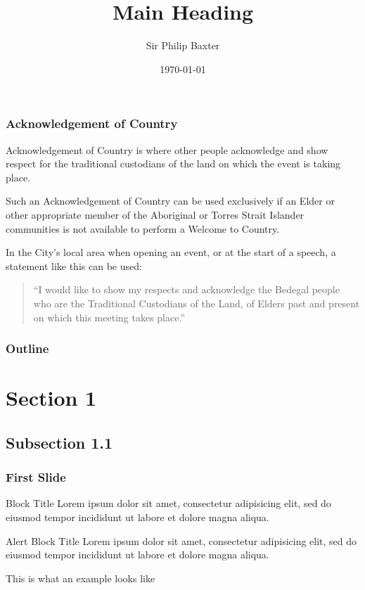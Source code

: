 \documentclass[11 pt, 
			   aspectratio=169
			   ]{beamer}
\title{Main Heading}
\date{\today}
\author[shortname]{Sir Philip Baxter}
\institute[EMU]{Optimal Position for Faculty/School Name}
\begin{document}
\begin{frame}[plain]
	\titlepage
\end{frame}

\begin{frame}
	\frametitle{Acknowledgement of Country}

	Acknowledgement of Country is where other people acknowledge and show respect for the traditional custodians of the land on which the event is taking place.
	
	Such an Acknowledgement of Country can be used exclusively if an Elder or other appropriate member of the Aboriginal or Torres Strait Islander communities is not available to perform a Welcome to Country.
	
	In the City's local area when opening an event, or at the start of a speech, a statement like this can be used:
	\vfill
	\begin{quote}
	``I would like to show my respects and acknowledge the Bedegal people who are the Traditional Custodians of the Land, of Elders past and present on which this meeting takes place.'' 
	\end{quote}
\end{frame}

\begin{frame}
	\frametitle{Outline}
	\tableofcontents
\end{frame}


\section{Section 1}
\subsection{Subsection 1.1}

\sectionframe
\subsectionframe



\begin{frame}
	\frametitle{First Slide}
		\begin{block}{Block Title}
			Lorem ipsum dolor sit amet, consectetur adipisicing elit, 
			sed do eiusmod tempor incididunt ut labore et 
			dolore magna aliqua.
		\end{block}
	
		\begin{alertblock}{Alert Block Title}
			Lorem ipsum dolor sit amet, consectetur adipisicing elit, 
			sed do eiusmod tempor incididunt ut labore et 
			dolore magna aliqua.
		\end{alertblock}
	
		\begin{example}
			This is what an example looks like
		\end{example}
	
\end{frame}
\end{document}
